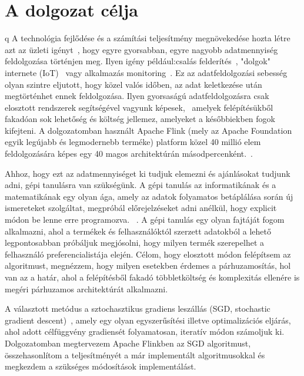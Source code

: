 \documentclass[a4paper,12pt]{article}
\begin{document}
\section{A dolgozat célja}
q
A technológia fejlődése és a számítási teljesítmény megnövekedése hozta létre azt az üzleti igényt~\cite{rta}, hogy egyre gyorsabban, egyre nagyobb adatmennyiség feldolgozása történjen meg. Ilyen igény például:csalás felderítés~\cite{fraud}, "dolgok" internete (IoT)~\cite{iot} vagy alkalmazás monitoring~\cite{ganalitycs}. Ez az adatfeldolgozási sebesség olyan szintre eljutott, hogy közel valós időben, az adat keletkezése után megtörténhet ennek feldolgozása. Ilyen gyorsaságú adatfeldolgozásra csak elosztott rendszerek segítségével vagyunk képesek,~\cite{ucl} amelyek felépítésükből fakadóan sok lehetőség és költség jellemez, amelyeket a későbbiekben fogok kifejteni. A dolgozatomban használt Apache Flink (mely az Apache Foundation egyik legújabb és legmodernebb terméke) platform közel 40 millió elem feldolgozására képes egy 40 magos architektúrán másodpercenként.~\cite{flink}.  \linebreak

Ahhoz, hogy ezt az adatmennyiséget ki tudjuk elemezni és ajánlásokat tudjunk adni, gépi tanulásra van szükségünk. A gépi tanulás az informatikának és a matematikának egy olyan ága, amely az adatok folyamatos betáplálása során új ismereteket szolgáltat, megpróbál előrejelzéseket adni anélkül, hogy explicit módon be lenne erre programozva. ~\cite{ml}. A gépi tanulás egy olyan fajtáját fogom alkalmazni, ahol a termékek és felhasználóktól szerzett adatokból a lehető legpontosabban próbáljuk megjósolni, hogy milyen termék szerepelhet a felhasználó preferencialistája elején. Célom, hogy elosztott módon felépítsem az algoritmust, megnézzem, hogy milyen esetekben érdemes a párhuzamosítás, hol van az a határ, ahol a felépítésből fakadó többletköltség és komplexitás ellenére is megéri párhuzamos architektúrát alkalmazni. 
\linebreak

A választott metódus a sztochasztikus gradiens leszállás (SGD, stochastic gradient descent)~\cite{sgd}, amely egy olyan egyszerűsítési illetve optimalizációs eljárás, ahol adott célfüggvény gradiensét folyamatosan, iteratív módon számoljuk ki. Dolgozatomban megtervezem Apache Flinkben az SGD algoritmust, összehasonlítom a teljesítményét a már implementált algoritmusokkal és megkezdem a szükséges módosítások implementálást.
\end{document}
